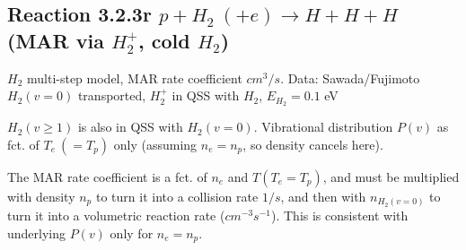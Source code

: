 \documentclass[12pt,dvips]{article}
\begin{document}
\subsection{
Reaction 3.2.3r   $p + H_2~ (+e)   \rightarrow H + H + H  $ (MAR via $H_2^+$, cold $H_2$)
}

$H_2$ multi-step model, MAR rate coefficient $cm^3/s$.
Data: Sawada/Fujimoto \cite{kn:Sawada}
$H_2(v=0)$ transported, $H_2^+$ in QSS with $H_2$, $E_{H_2}=0.1$ eV

$H_2(v\geq 1)$ is also in QSS with $H_2(v=0)$. Vibrational distribution $P(v)$ as fct. of $T_e~(=T_p)$ only (assuming $n_e=n_p$, so density cancels here).

The MAR rate coefficient is a fct. of $n_e$ and $T (T_e=T_p)$, and must be multiplied with density $n_p$ to turn it into a collision rate $1/s$,
and then with $n_{H_2(v=0)}$ to turn it into a volumetric reaction rate ($cm^{-3}s^{-1}$). This is consistent with underlying $P(v)$ only
for $n_e=n_p$.
\end{document}
